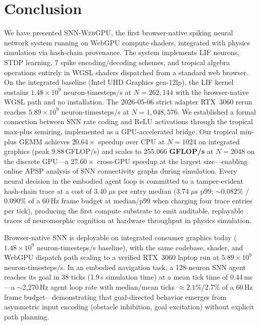 \documentclass[10pt]{article}
\newcommand{\snnwebgpu}{\textsc{SNN-WebGPU}}
\begin{document}
\section{Conclusion}
\label{sec:conclusion}

We have presented \snnwebgpu{}, the first browser-native spiking neural network
system running on WebGPU compute shaders, integrated with physics simulation
via hash-chain provenance.
The system implements LIF neurons, STDP learning, 7 spike encoding/decoding
schemes, and tropical algebra operations entirely in WGSL shaders dispatched
from a standard web browser.
On the integrated baseline (Intel UHD Graphics gen-12lp), the LIF kernel
sustains $1.48 \times 10^9$ neuron-timesteps/s at $N = 262{,}144$ with
the browser-native WGSL path and no installation. The 2026-05-06 strict
adapter RTX~3060 rerun reaches $5.89 \times 10^9$ neuron-timesteps/s at
$N = 1{,}048{,}576$.
We established a formal connection between SNN rate coding and ReLU activations
through the tropical max-plus semiring, implemented as a GPU-accelerated bridge.
Our tropical min-plus GEMM achieves $20.64\times$ speedup over CPU at $N = 1024$
on integrated graphics (peak $9.88$\,GFLOP/s) and scales to $\mathbf{255.066}$
\textbf{GFLOP/s} at $N = 2048$ on the discrete GPU---a $27.60\times$ cross-GPU
speedup at the largest size---enabling online APSP analysis of SNN connectivity
graphs during simulation.
Every neural decision in the embodied agent loop is committed to a tamper-evident
hash-chain trace at a cost of $3.40\;\mu$s per entry median ($3.74\;\mu$s p99;
$\sim\!0.082\%$ / $0.090\%$ of a 60\,Hz frame budget at median/p99 when charging four trace entries per tick), producing the first compute substrate to emit auditable, replayable traces of neuromorphic
cognition at hardware throughput in physics simulation.

Browser-native SNN is deployable on integrated consumer graphics today
($1.48 \times 10^9$ neuron-timesteps/s baseline), with the same codebase,
shader, and WebGPU dispatch path scaling to a verified RTX~3060 laptop run
at $5.89 \times 10^9$ neuron-timesteps/s.
In an embodied navigation task, a 128-neuron SNN agent reaches its goal in
38 ticks (1.9\,s simulation time) at a mean tick time of 0.44\,ms---a
$\sim$2{,}270\,Hz agent loop rate with median/mean ticks $\approx 2.1\% / 2.7\%$ of a 60\,Hz frame
budget---demonstrating that goal-directed behavior emerges from asymmetric
input encoding (obstacle inhibition, goal excitation) without explicit path
planning.
\end{document}

